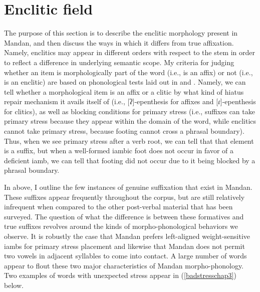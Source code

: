 \section{Enclitic field}\label{SecPhrasalMorphology}

The purpose of this section is to describe the enclitic morphology present in Mandan, and then discuss the ways in which it differs from true affixation. Namely, enclitics may appear in different orders with respect to the stem in order to reflect a difference in underlying semantic scope. My criteria for judging whether an item is morphologically part of the word (i.e., is an affix) or not (i.e., is an enclitic) are based on phonological tests laid out in  and . Namely, we can tell whether a morphological item is an affix or a clitic by what kind of hiatus repair mechanism it avails itself of (i.e., [ʔ]-epenthesis for affixes and [ɾ]-epenthesis for clitics), as well as blocking conditions for primary stress (i.e., suffixes can take primary stress because they appear within the domain of the word, while enclitics cannot take primary stress, because footing cannot cross a phrasal boundary). Thus, when we see primary stress after a verb root, we can tell that that element is a suffix, but when a well-formed iambic foot does not occur in favor of a deficient iamb, we can tell that footing did not occur due to it being blocked by a phrasal boundary.

In  above, I outline the few instances of genuine suffixation that exist in Mandan. These suffixes appear frequently throughout the corpus, but are still relatively infrequent when compared to the other post-verbal material that has been surveyed. The question of what the difference is between these formatives and true suffixes revolves around the kinds of morpho-phonological behaviors we observe. It is robustly the case that Mandan prefers left-aligned weight-sensitive iambs for primary stress placement and likewise that Mandan does not permit two vowels in adjacent syllables to come into contact. A large number of words appear to flout these two major characteristics of Mandan morpho-phonology. Two examples of words with unexpected stress appear in (\ref{badstresschap3}) below.

